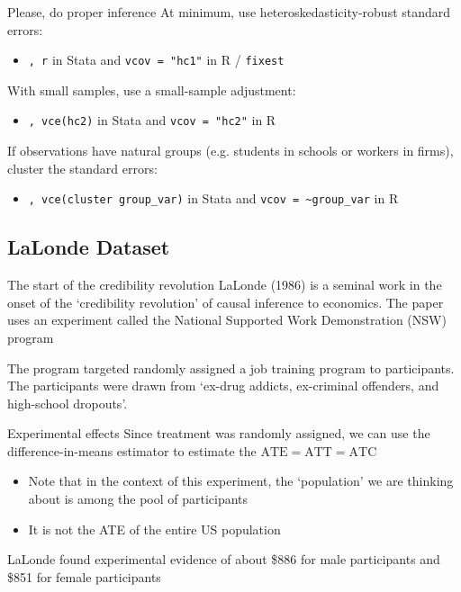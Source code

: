 \documentclass[aspectratio=169,t,11pt,table]{beamer}
\begin{document}
\begin{frame}{Please, do proper inference}
  At minimum, use heteroskedasticity-robust standard errors:
  \begin{itemize}
    \item \texttt{, r} in Stata and \texttt{vcov = "hc1"} in R / \texttt{fixest}
  \end{itemize}

  \pause
  \bigskip
  With small samples, use a small-sample adjustment:
  \begin{itemize}
    \item \texttt{, vce(hc2)} in Stata and \texttt{vcov = "hc2"} in R
  \end{itemize}

  \pause
  \bigskip
  If observations have natural groups (e.g. students in schools or workers in firms), cluster the standard errors:
  \begin{itemize}
    \item \texttt{, vce(cluster group\_var)} in Stata and \texttt{vcov = \textasciitilde group\_var} in R
  \end{itemize}
\end{frame}




\subsection{LaLonde Dataset}

\begin{frame}{The start of the credibility revolution}
  LaLonde (1986) is a seminal work in the onset of the `credibility revolution' of causal inference to economics. The paper uses an experiment called the National Supported Work Demonstration (NSW) program

  \bigskip
  The program targeted randomly assigned a job training program to participants. The participants were drawn from `ex-drug addicts, ex-criminal offenders, and high-school dropouts'. 
\end{frame}

\begin{frame}{Experimental effects}
  Since treatment was randomly assigned, we can use the difference-in-means estimator to estimate the $\text{ATE} = \text{ATT} = \text{ATC}$
  \begin{itemize}
    \item Note that in the context of this experiment, the `population' we are thinking about is among the pool of participants
    \item It is not the ATE of the entire US population
  \end{itemize}
	
	\bigskip
	LaLonde found experimental evidence of about \$886 for male participants and \$851 for female participants
\end{frame}
\end{document}
